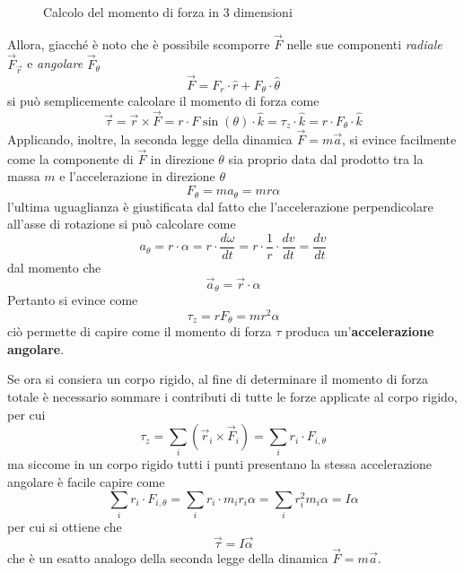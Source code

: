 \documentclass[a4paper]{extarticle}
\begin{document}
\begin{figure}[H]
  \centering
  \caption{Calcolo del momento di forza in 3 dimensioni}
  \label{fig:momento_forza_tridimensionale}
\end{figure}

\noindent
Allora, giacché è noto che è possibile scomporre $\vec F$ nelle sue componenti \emph{radiale} $\vec F_{\vec r}$ e \emph{angolare} $\vec F_{\theta}$
\[\vec F = F_r \cdot \hat{r} + F_{\theta} \cdot \hat{\theta}\]
si può semplicemente calcolare il momento di forza come
\[\vec \tau = \vec r \times \vec F = r \cdot F \sin(\theta) \cdot \hat{k} = \tau_z \cdot \hat{k} = r \cdot F_\theta \cdot \hat{k}\]
Applicando, inoltre, la seconda legge della dinamica $\vec F = m \vec a$, si evince facilmente come la componente di $\vec F$ in direzione $\theta$ sia proprio data dal prodotto tra la massa $m$ e l'accelerazione in direzione $\theta$
\[F_\theta=m a_\theta=mr\alpha\]
l'ultima uguaglianza è giustificata dal fatto che l'accelerazione perpendicolare all'asse di rotazione si può calcolare come
\[a_\theta=r \cdot \alpha=r \cdot \frac{d \omega}{d t} = r \cdot \frac{1}{r} \cdot \frac{dv}{dt} = \frac{dv}{dt}\]
dal momento che
\[\boxed{\vec a_\theta = \vec r \cdot \alpha}\]
Pertanto si evince come
\[\boxed{\tau_z=r F_\theta=m r^2 \alpha}\]
ciò permette di capire come il momento di forza $\tau$ produca un'\textbf{accelerazione angolare}.

\vspace{1em}
\noindent
Se ora si consiera un corpo rigido, al fine di determinare il momento di forza totale è necessario sommare i contributi di tutte le forze applicate al corpo rigido, per cui
\[\tau_z=\sum_i \left(\vec r_i \times \vec F_i\right) = \sum_{i} r_i \cdot F_{i,\theta}\]
ma siccome in un corpo rigido tutti i punti presentano la stessa accelerazione angolare è facile capire come
\[\sum_{i} r_i \cdot F_{i,\theta} = \sum_{i} r_i \cdot m_i r_i \alpha = \sum_{i} r_i^2 m_i \alpha = I \alpha\]
per cui si ottiene che
\[\boxed{\vec \tau = I \vec \alpha}\]
che è un esatto analogo della seconda legge della dinamica $\vec F = m \vec a$.
\end{document}

